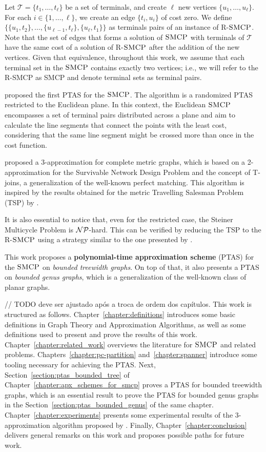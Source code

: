 Let \(\mathcal{T} = \{t_1, \dots, t_\ell\}\) be a set of terminals, and create \(\ell\) new vertices \(\{u_1, \dots, u_\ell\}\). For each \(i \in \{1, \ldots, \ell\}\), we create an edge \(\{t_i, u_i\}\) of cost zero. We define \(\{\{u_1, t_2\}, \dots, \{u_{\ell-1}, t_\ell\}, \{u_\ell, t_1\}\}\) as terminals pairs of an instance of R-\(\textsc{SMCP}\). Note that the set of edges that forms a solution of \(\textsc{SMCP}\) with terminals of \(\mathcal{T}\) have the same cost of a solution of R-\(\textsc{SMCP}\) after the addition of the new vertices. Given that equivalence, throughout this work, we assume that each terminal set in the \(\textsc{SMCP}\) contains exactly two vertices; i.e., we will refer to the R-SMCP as SMCP and denote terminal sets as terminal pairs.

\cite{LINTZMAYER2020134} proposed the first PTAS for the \(\textsc{SMCP}\). The algorithm is a randomized PTAS restricted to the Euclidean plane. In this context, the Euclidean \(\textsc{SMCP}\) encompasses a set of terminal pairs distributed across a plane and aim to calculate the line segments that connect the points with the least cost, considering that the same line segment might be crossed more than once in the cost function.

\cite{smcp_3apx} proposed a 3-approximation for complete metric graphs, which is based on a 2-approximation for the Survivable Network Design Problem and the concept of T-joins, a generalization of the well-known perfect matching. This algorithm is inspired by the results obtained for the metric Travelling Salesman Problem (TSP) by \cite{Christofides2022WorstCaseAO}.

It is also essential to notice that, even for the restricted case, the Steiner Multicycle Problem is \(\mathcal{NP}\)-hard. This can be verified by reducing the TSP to the R-\(\textsc{SMCP}\) using a strategy similar to the one presented by \citeauthor{LINTZMAYER2020134}.

This work proposes a \textbf{polynomial-time approximation scheme} (PTAS) for the \(\textsc{SMCP}\) on \textit{bounded treewidth graphs}. On top of that, it also presents a PTAS on \textit{bounded genus graphs}, which is a generalization of the well-known class of planar graphs.

// TODO deve ser ajustado após a troca de ordem dos capítulos.
This work is structured as follows. Chapter~\ref{chapter:definitions} introduces some basic definitions in Graph Theory and Approximation Algorithms, as well as some definitions used to present and prove the results of this work. Chapter~\ref{chapter:related_work} overviews the literature for \(\textsc{SMCP}\) and related problems. Chapters~\ref{chapter:pc-partition} and~\ref{chapter:spanner} introduce some tooling necessary for achieving the PTAS. Next, Section~\ref{section:ptas_bounded_tree} of Chapter~\ref{chapter:apx_schemes_for_smcp} proves a PTAS for bounded treewidth graphs, which is an essential result to prove the PTAS for bounded genus graphs in the Section~\ref{section:ptas_bounded_genus} of the same chapter. Chapter~\ref{chapter:experiments} presents some experimental results of the 3-approximation algorithm proposed by \cite{smcp_3apx}. Finally, Chapter~\ref{chapter:conclusion} delivers general remarks on this work and proposes possible paths for future work.
